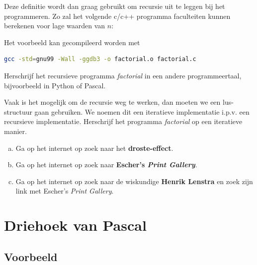 \documentclass[12pt,a4paper,twoside]{article}
\begin{document}
Deze definitie wordt dan graag gebruikt om recursie uit te leggen bij het programmeren. Zo zal het volgende c/c++ programma faculteiten kunnen berekenen voor lage waarden van $n$:




Het voorbeeld kan gecompileerd worden met
\begin{lstlisting}[language=bash]
  gcc -std=gnu99 -Wall -ggdb3 -o factorial.o factorial.c
\end{lstlisting}

\begin{oefening}
Herschrijf het recursieve programma {\em factorial} in een andere programmeertaal, bijvoorbeeld in Python of Pascal.
\end{oefening}

\begin{oefening}
Vaak is het mogelijk om de recursie weg te werken, dan moeten we een lus-structuur gaan gebruiken. We noemen dit een iteratieve implementatie i.p.v. een recursieve implementatie. Herschrijf het programma {\em factorial} op een iteratieve manier.
\end{oefening}

\begin{oefening}
\begin{enumerate}[(a)]
\item Ga op het internet op zoek naar het {\bf droste-effect}.
\item Ga op het internet op zoek naar {\bf Escher's {\em Print Gallery}}.
\item Ga op het internet op zoek naar de wiskundige {\bf Henrik Lenstra} en zoek zijn link met Escher's {\em Print Gallery}.
\end{enumerate}
\end{oefening}


\pagebreak
\section{Driehoek van Pascal}

\subsection{Voorbeeld}
\end{document}

